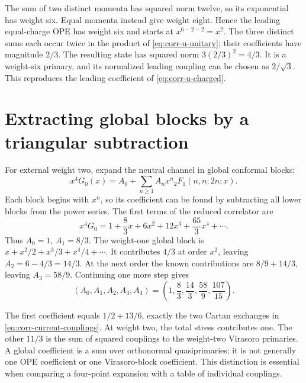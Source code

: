 \begin{example}
The sum of two distinct momenta has squared norm twelve, so its
exponential has weight six. Equal momenta instead give weight
eight. Hence the leading equal-charge OPE has weight six and
starts at $x^{6-2-2}=x^2$.
The three distinct sums each occur twice in the product of
\eqref{eq:corr-u-unitary}; their coefficients have magnitude
$2/3$. The resulting state has squared norm
$3(2/3)^2=4/3$. It is a weight-six primary, and its normalized
leading coupling can be chosen as $2/\sqrt3$. This reproduces
the leading coefficient of \eqref{eq:corr-u-charged}.
\end{example}

\section{Extracting global blocks by a triangular subtraction}

For external weight two, expand the neutral channel in global
conformal blocks:
\begin{equation}
 x^4G_0(x)=A_0+\sum_{n\ge1}A_nx^n
                         {}_2F_1(n,n;2n;x).
 \label{eq:corr-global}
\end{equation}
Each block begins with $x^n$, so its coefficient can be found by
subtracting all lower blocks from the power series. The first
terms of the reduced correlator are
\[
 x^4G_0=1+\frac83x+6x^2+12x^3+\frac{65}3x^4+\cdots.
\]
Thus $A_0=1$, $A_1=8/3$. The weight-one global block is
$x+x^2/2+x^3/3+x^4/4+\cdots$. It contributes $4/3$ at order
$x^2$, leaving $A_2=6-4/3=14/3$. At the next order the known
contributions are $8/9+14/3$, leaving $A_3=58/9$.
Continuing one more step gives
\begin{equation}
 (A_0,A_1,A_2,A_3,A_4)
 =\left(1,\frac83,\frac{14}3,\frac{58}9,\frac{107}{15}\right).
 \label{eq:corr-global-coefficients}
\end{equation}

The first coefficient equals $1/2+13/6$, exactly the two Cartan
exchanges in \eqref{eq:corr-current-couplings}. At weight two,
the total stress contributes one. The other $11/3$ is the sum
of squared couplings to the weight-two Virasoro primaries.
A global coefficient is a sum over orthonormal quasiprimaries;
it is not generally one OPE coefficient or one Virasoro-block
coefficient. This distinction is essential when comparing a
four-point expansion with a table of individual couplings.

